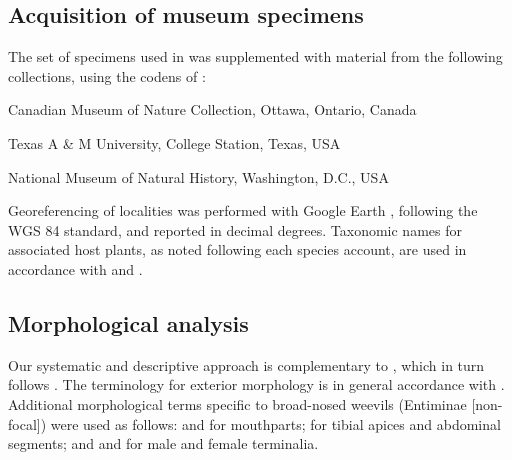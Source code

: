 \documentclass[fleqn,10pt,lineno]{wlpeerj} %
\begin{document}
	\subsection*{Acquisition of museum specimens}\label{ssec:museum} 
		The set of specimens used in \citet{jansen2015} was supplemented with material from the following collections, using the codens of \citet{arnett1993}:
		
		\begin{description}[itemsep=-1ex]
			\item[\texttt{CMNC}] Canadian Museum of Nature Collection, Ottawa, Ontario, Canada
			\item[\texttt{TAMU}] Texas A \& M University, College Station, Texas, USA
			\item[\texttt{USNM}] National Museum of Natural History, Washington, D.C., USA
		\end{description}

			Georeferencing of localities was performed with Google Earth \citep{google2018}, following the WGS 84 standard, and reported in decimal degrees.
		Taxonomic names for associated host plants, as noted following each species account, are used in accordance with \citet{munz1973} and \citet{seinet2018}.
		
	\subsection*{Morphological analysis}\label{ssec:morph} 
		Our systematic and descriptive approach is complementary to \citet{jansen2015}, which in turn follows \citet{franz2010a, franz2010b, franz2012}.
		The terminology for exterior morphology is in general accordance with \citet{torre1989}.
		Additional morphological terms specific to broad-nosed weevils (Entiminae [non-focal]) were used as follows:
			\citet{ting1936} and \citet{morimoto2003} for mouthparts;
			\citet{thompson1992} for tibial apices and abdominal segments;
			and \citet{oberprieler2014} and \citet{howden1995} for male and female terminalia.
		
\end{document}

